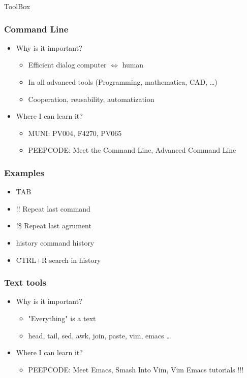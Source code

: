 \documentclass[fleqn]{beamer}
\begin{document}
\begin{section}{ToolBox}
  \begin{frame}\frametitle{Command Line}
  \begin{itemize}
    \item{Why is it important?}
    \begin{itemize}
      \item{Efficient dialog computer $\Longleftrightarrow$ human}
      \item{In all advanced tools (Programming, mathematica, CAD, \ldots)}
      \item{Cooperation, reusability, automatization }
    \end{itemize}

    \item{Where I can learn it?}
    \begin{itemize}
      \item MUNI: PV004, F4270, PV065 
      \item PEEPCODE: Meet the Command Line, Advanced Command Line  
    \end{itemize}
  \end{itemize}





  \end{frame}

  \begin{frame}\frametitle{Examples}
  \begin{itemize}
    \item TAB 
    \item !! Repeat last command
    \item !\$ Repeat last agrument
    \item history command history
    \item CTRL+R search in history
  \end{itemize}
  \end{frame}

  
  \begin{frame}\frametitle{Text tools}
  \begin{itemize}
    \item{Why is it important?}
      \begin{itemize}
      \item "Everything" is a text
      \item head, tail, sed, awk, join, paste, vim, emacs \ldots
      \end{itemize}
 \item{Where I can learn it?}
  \begin{itemize}
      \item PEEPCODE: Meet Emacs, Smash Into Vim, Vim Emacs tutorials !!! 
  \end{itemize}
  \end{itemize}
  \end{frame}


\end{section}
\end{document}
